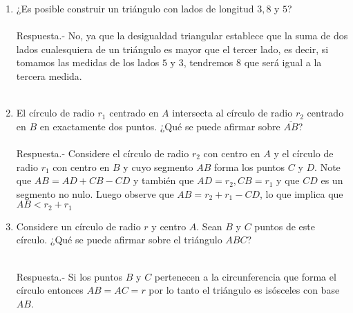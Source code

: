 \documentclass[10pt]{article}
\begin{document}
\begin{enumerate}
	\item ¿Es posible construir un triángulo con lados de longitud $3,8$ y $5$?\\\\
	Respuesta.-\; No, ya que la desigualdad triangular establece que la suma de dos lados cualesquiera de un triángulo es mayor que el tercer lado, es decir, si tomamos las medidas de los lados $5$ y $3$, tendremos $8$ que será igual a la tercera medida.\\\\

	\item El círculo de radio $r_1$ centrado en $A$ intersecta al círculo de radio $r_2$ centrado en $B$ en exactamente dos puntos. ¿Qué se puede afirmar sobre $\overline{AB}$?\\\\
	Respuesta.-\; Considere el círculo de radio $r_2$ con centro en $A$ y el círculo de radio $r_1$ con centro en $B$ y cuyo segmento $AB$ forma los puntos $C$ y $D$. Note que $AB = AD + CB - CD$ y también que $AD = r_2, CB = r_1$ y que $CD$ es un segmento no nulo. Luego observe que  $AB = r_2 + r_1 - CD$, lo que implica que $AB <r_2 + r_1$\\
	\begin{center}
	\end{center}

	\item Considere un círculo de radio $r$ y centro $A$. Sean $B$ y $C$ puntos de este círculo. ¿Qué se puede afirmar sobre el triángulo $ABC$?\\\\
	\begin{center}
	\end{center}
	Respuesta.-\; Si los puntos $B$ y $C$ pertenecen a la circunferencia que forma el círculo entonces $AB = AC = r$ por lo tanto el triángulo es isósceles con base $AB$.\\\\


\end{enumerate}
\end{document}
